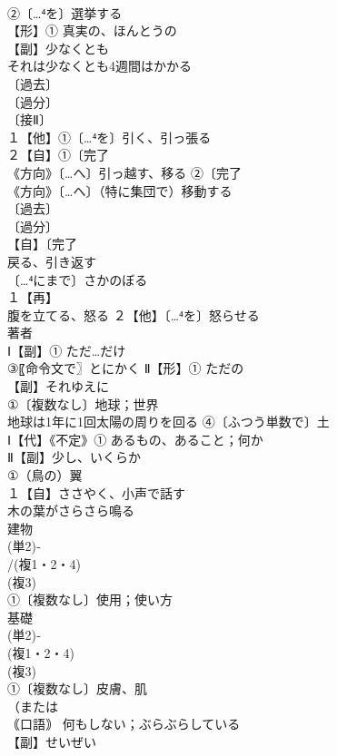 \documentclass[8pt]{extreport}
\begin{document}
\begin{CJK}{UTF8}{min}
\\	②〔…⁴を〕選挙する
\\	【形】① 真実の、ほんとうの 
\\	【副】少なくとも 
\\	それは少なくとも4週間はかかる
\\	〔過去〕
\\	〔過分〕
\\	〔接Ⅱ〕
\\	１【他】①〔…⁴を〕引く、引っ張る 
\\	２【自】①〔完了
\\	《方向》〔…へ〕引っ越す、移る ②〔完了
\\	《方向》〔…へ〕（特に集団で）移動する
\\	〔過去〕
\\	〔過分〕
\\	【自】〔完了
\\	戻る、引き返す 
\\	〔…⁴にまで〕さかのぼる
\\	１【再】
\\	腹を立てる、怒る ２【他】〔…⁴を〕怒らせる
\\	著者 
\\	Ⅰ【副】① ただ…だけ 
\\	③〖命令文で〗とにかく Ⅱ【形】① ただの
\\	【副】それゆえに 
\\	①〔複数なし〕地球；世界 
\\	地球は1年に1回太陽の周りを回る ④〔ふつう単数で〕土 
\\	Ⅰ【代】《不定》① あるもの、あること；何か 
\\	Ⅱ【副】少し、いくらか 
\\	①（鳥の）翼 
\\	１【自】ささやく、小声で話す 
\\	木の葉がさらさら鳴る
\\	建物 
\\	(単2)‐
\\	/(複1・2・4)
\\	(複3)
\\	①〔複数なし〕使用；使い方 
\\	基礎 
\\	(単2)‐ 
\\	(複1・2・4)
\\	(複3)
\\	①〔複数なし〕皮膚、肌 
\\	（または
\\	｟口語｠ 何もしない；ぶらぶらしている
\\	【副】せいぜい 

\end{CJK}
\end{document}
